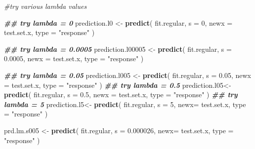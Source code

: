 \documentclass[
]{article}
\newenvironment{Shaded}{\begin{snugshade}}{\end{snugshade}}
\newcommand{\AttributeTok}[1]{\textcolor[rgb]{0.13,0.29,0.53}{#1}}
\newcommand{\CommentTok}[1]{\textcolor[rgb]{0.56,0.35,0.01}{\textit{#1}}}
\newcommand{\DecValTok}[1]{\textcolor[rgb]{0.00,0.00,0.81}{#1}}
\newcommand{\DocumentationTok}[1]{\textcolor[rgb]{0.56,0.35,0.01}{\textbf{\textit{#1}}}}
\newcommand{\FloatTok}[1]{\textcolor[rgb]{0.00,0.00,0.81}{#1}}
\newcommand{\FunctionTok}[1]{\textcolor[rgb]{0.13,0.29,0.53}{\textbf{#1}}}
\newcommand{\NormalTok}[1]{#1}
\newcommand{\OtherTok}[1]{\textcolor[rgb]{0.56,0.35,0.01}{#1}}
\newcommand{\StringTok}[1]{\textcolor[rgb]{0.31,0.60,0.02}{#1}}
\begin{document}
\begin{Shaded}
\begin{Highlighting}[]
\CommentTok{\#try various lambda values}

\DocumentationTok{\#\# try lambda = 0}
\NormalTok{prediction.l0 }\OtherTok{\textless{}{-}}  
  \FunctionTok{predict}\NormalTok{(}
\NormalTok{    fit.regular, }
    \AttributeTok{s =} \DecValTok{0}\NormalTok{, }
    \AttributeTok{newx =}\NormalTok{ test.set.x,}
    \AttributeTok{type =} \StringTok{"response"}
\NormalTok{    )}

\DocumentationTok{\#\# try lambda = 0.0005}
\NormalTok{prediction.l00005 }\OtherTok{\textless{}{-}}  
  \FunctionTok{predict}\NormalTok{(}
\NormalTok{    fit.regular, }
    \AttributeTok{s =} \FloatTok{0.0005}\NormalTok{, }
    \AttributeTok{newx =}\NormalTok{ test.set.x,}
    \AttributeTok{type =} \StringTok{"response"}
\NormalTok{    )}

\DocumentationTok{\#\# try lambda = 0.05}
\NormalTok{prediction.l005 }\OtherTok{\textless{}{-}}  
  \FunctionTok{predict}\NormalTok{(}
\NormalTok{    fit.regular, }
    \AttributeTok{s =} \FloatTok{0.05}\NormalTok{, }
    \AttributeTok{newx =}\NormalTok{ test.set.x,}
    \AttributeTok{type =} \StringTok{"response"}
\NormalTok{    )}
\DocumentationTok{\#\# try lambda = 0.5}
\NormalTok{prediction.l05}\OtherTok{\textless{}{-}}  
  \FunctionTok{predict}\NormalTok{(}
\NormalTok{    fit.regular, }
    \AttributeTok{s =} \FloatTok{0.5}\NormalTok{, }
    \AttributeTok{newx =}\NormalTok{ test.set.x,}
    \AttributeTok{type =} \StringTok{"response"}
\NormalTok{  )}
\DocumentationTok{\#\# try lambda = 5}
\NormalTok{prediction.l5}\OtherTok{\textless{}{-}}  
  \FunctionTok{predict}\NormalTok{(}
\NormalTok{    fit.regular, }
    \AttributeTok{s =} \DecValTok{5}\NormalTok{, }
    \AttributeTok{newx=}\NormalTok{ test.set.x,}
    \AttributeTok{type =} \StringTok{"response"}
\NormalTok{    )}

\NormalTok{prd.lm.s005 }\OtherTok{\textless{}{-}}  
  \FunctionTok{predict}\NormalTok{(}
\NormalTok{    fit.regular, }
    \AttributeTok{s =} \FloatTok{0.000026}\NormalTok{, }
    \AttributeTok{newx=}\NormalTok{ test.set.x,}
    \AttributeTok{type =} \StringTok{"response"}
\NormalTok{    )}
\end{Highlighting}
\end{Shaded}
\end{document}

